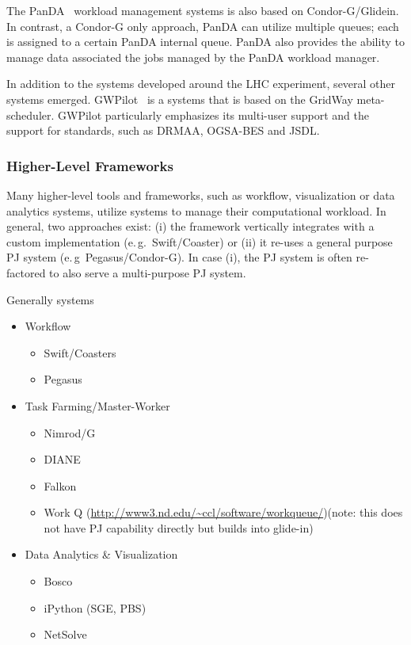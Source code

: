 \documentclass{sig-alternate}
\begin{document}
The PanDA~\cite{1742-6596-331-7-072069} workload management systems is also 
based on Condor-G/Glidein. In contrast, a Condor-G only approach,
PanDA can utilize multiple queues; each \pilot is assigned to a certain PanDA
internal queue. PanDA also provides the ability to manage data associated the 
jobs managed by the PanDA workload manager.

In addition to the \pilotjob systems developed around the LHC experiment, 
several other systems emerged. GWPilot~\cite{gwpilot} is a \pilot systems that 
is based on the GridWay meta-scheduler. GWPilot particularly emphasizes its 
multi-user support and the support for standards, such as DRMAA, OGSA-BES and 
JSDL.

\subsubsection*{Higher-Level Frameworks}

Many higher-level tools and frameworks, such as workflow, visualization or
data analytics systems, utilize \pilotjob systems to manage their
computational workload. In general, two approaches exist: (i) the framework
vertically integrates with a custom \pilotjob implementation (e.\,g.\
Swift/Coaster) or (ii) it re-uses a general purpose PJ system (e.\,g\
Pegasus/Condor-G). In case (i), the PJ system is often re-factored to also
serve a multi-purpose PJ system.

Generally \pj systems
\begin{itemize}
	\item Workflow
	\begin{itemize}
		\item Swift/Coasters
		\item Pegasus
	\end{itemize}
	\item Task Farming/Master-Worker
	\begin{itemize}
		\item Nimrod/G 
		\item DIANE
		\item Falkon 
        \item Work Q (\url{http://www3.nd.edu/~ccl/software/workqueue/})(note: this does not have PJ capability directly but builds into glide-in)
	\end{itemize}
	\item Data Analytics \& Visualization
	\begin{itemize}
		\item Bosco
		\item iPython (SGE, PBS)
		\item NetSolve~\cite{Casanova:1995:NNS:898848}
	\end{itemize}		
\end{itemize}
\end{document}
